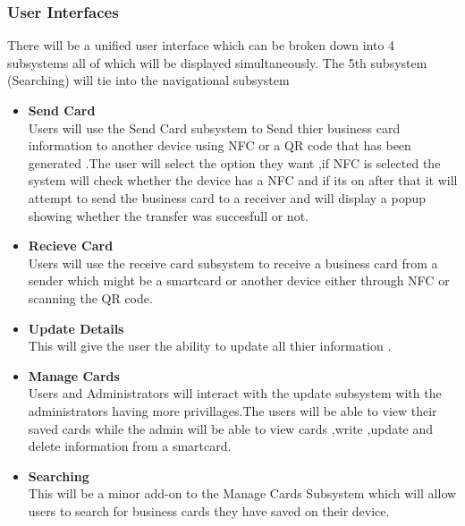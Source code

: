 \documentclass[english]{article}
\begin{document}
						\subsubsection{User Interfaces}
						    There will be a unified user interface which can be broken down into 4 subsystems all of which will be displayed 		           simultaneously. The 5th subsystem (Searching) will tie into the navigational subsystem \\
                                                  \begin{itemize}
					        \item \textbf{Send Card}\\
						Users will use the Send Card subsystem to Send thier business card information to another device using NFC or a QR code that has been generated .The user will select the option they want ,if NFC is selected the system will check whether the device has a NFC and if its on after that 	it will attempt to send the business card to a receiver and will display a popup showing whether the transfer was succesfull or not.				       

						\item \textbf{Recieve Card}\\
						Users will use the receive card subsystem to receive a business card from a sender which might be a smartcard or another device either through NFC or scanning the QR code.

						\item \textbf{Update Details}\\
						This will give the user the ability to update all thier information .
						
						\item \textbf{Manage Cards}\\
						Users and Administrators will interact with the update subsystem with the administrators having more privillages.The users will be able to view their saved cards while the admin will be able to view cards ,write ,update and delete information from a smartcard.

                                                 
                                              
                                                \item \textbf{Searching}\\
						This will be a minor add-on to the Manage Cards Subsystem which will allow users to search for business cards they have saved on their device.
                                                  \end{itemize}
\end{document}
